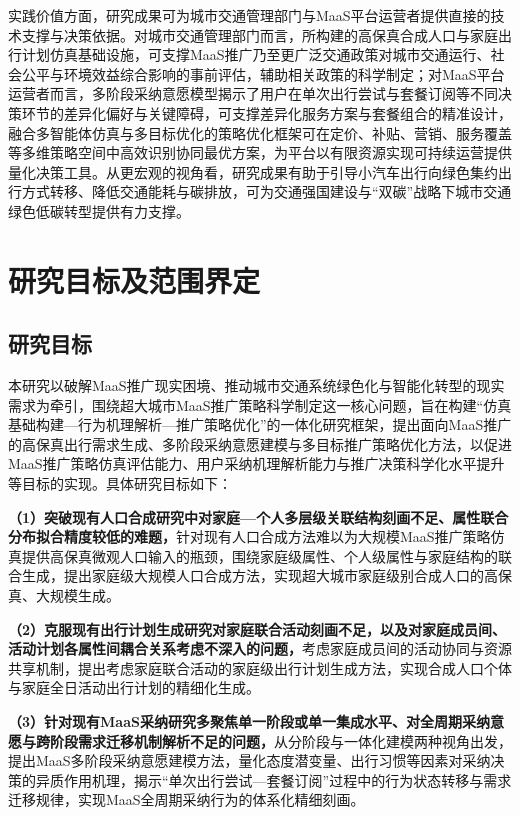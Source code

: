 实践价值方面，研究成果可为城市交通管理部门与MaaS平台运营者提供直接的技术支撑与决策依据。对城市交通管理部门而言，所构建的高保真合成人口与家庭出行计划仿真基础设施，可支撑MaaS推广乃至更广泛交通政策对城市交通运行、社会公平与环境效益综合影响的事前评估，辅助相关政策的科学制定；对MaaS平台运营者而言，多阶段采纳意愿模型揭示了用户在单次出行尝试与套餐订阅等不同决策环节的差异化偏好与关键障碍，可支撑差异化服务方案与套餐组合的精准设计，融合多智能体仿真与多目标优化的策略优化框架可在定价、补贴、营销、服务覆盖等多维策略空间中高效识别协同最优方案，为平台以有限资源实现可持续运营提供量化决策工具。从更宏观的视角看，研究成果有助于引导小汽车出行向绿色集约出行方式转移、降低交通能耗与碳排放，可为交通强国建设与``双碳''战略下城市交通绿色低碳转型提供有力支撑。

\section{研究目标及范围界定}\label{sec.intro.objective}

\subsection{研究目标}\label{subsec.intro.objective}

本研究以破解MaaS推广现实困境、推动城市交通系统绿色化与智能化转型的现实需求为牵引，围绕超大城市MaaS推广策略科学制定这一核心问题，旨在构建``仿真基础构建—行为机理解析—推广策略优化''的一体化研究框架，提出面向MaaS推广的高保真出行需求生成、多阶段采纳意愿建模与多目标推广策略优化方法，以促进MaaS推广策略仿真评估能力、用户采纳机理解析能力与推广决策科学化水平提升等目标的实现。具体研究目标如下：
 
\textbf{（1）突破现有人口合成研究中对家庭—个人多层级关联结构刻画不足、属性联合分布拟合精度较低的难题，}针对现有人口合成方法难以为大规模MaaS推广策略仿真提供高保真微观人口输入的瓶颈，围绕家庭级属性、个人级属性与家庭结构的联合生成，提出家庭级大规模人口合成方法，实现超大城市家庭级别合成人口的高保真、大规模生成。
 
\textbf{（2）克服现有出行计划生成研究对家庭联合活动刻画不足，以及对家庭成员间、活动计划各属性间耦合关系考虑不深入的问题，}考虑家庭成员间的活动协同与资源共享机制，提出考虑家庭联合活动的家庭级出行计划生成方法，实现合成人口个体与家庭全日活动出行计划的精细化生成。
 
\textbf{（3）针对现有MaaS采纳研究多聚焦单一阶段或单一集成水平、对全周期采纳意愿与跨阶段需求迁移机制解析不足的问题，}从分阶段与一体化建模两种视角出发，提出MaaS多阶段采纳意愿建模方法，量化态度潜变量、出行习惯等因素对采纳决策的异质作用机理，揭示``单次出行尝试—套餐订阅''过程中的行为状态转移与需求迁移规律，实现MaaS全周期采纳行为的体系化精细刻画。

